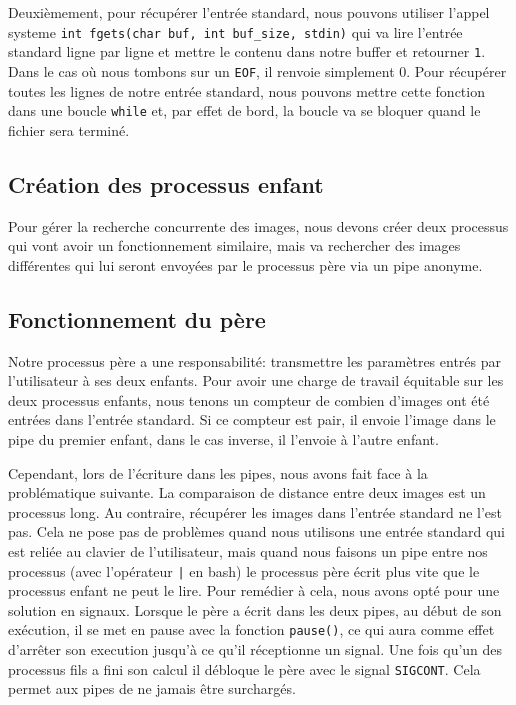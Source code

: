 \documentclass[french]{article}
\begin{document}
Deuxièmement, pour récupérer l'entrée standard, nous pouvons utiliser l'appel systeme \texttt{int fgets(char buf, int buf\_size, stdin)} qui va lire
l'entrée standard ligne par ligne et mettre le contenu dans notre buffer et retourner \texttt{1}. Dans le cas où nous tombons sur un \texttt{EOF}, il renvoie 
simplement 0. Pour récupérer toutes les lignes de notre entrée standard, nous pouvons mettre cette fonction dans une boucle \texttt{while} et, par effet de bord,
la boucle va se bloquer quand le fichier sera terminé. 

\subsection{Création des processus enfant}
Pour gérer la recherche concurrente des images, nous devons créer deux processus qui vont avoir un fonctionnement similaire, mais va rechercher des images différentes
qui lui seront envoyées par le processus père via un pipe anonyme.

\subsection{Fonctionnement du père}
Notre processus père a une responsabilité: transmettre les paramètres entrés par l'utilisateur à ses deux enfants. Pour avoir une charge de travail équitable sur les 
deux processus enfants, nous tenons un compteur de combien d'images ont été entrées dans l'entrée standard. Si ce compteur est pair, il envoie l'image dans le pipe 
du premier enfant, dans le cas inverse, il l'envoie à l'autre enfant. 

Cependant, lors de l'écriture dans les pipes, nous avons fait face à la problématique suivante. La comparaison de distance entre deux images est un processus long. Au 
contraire, récupérer les images dans l'entrée standard ne l'est pas. Cela ne pose pas de problèmes quand nous utilisons une entrée standard qui est reliée au clavier 
de l'utilisateur, mais quand nous faisons un pipe entre nos processus (avec l'opérateur \texttt{|} en bash) le processus père écrit plus vite 
que le processus enfant ne peut le lire. Pour remédier à cela, nous avons opté pour une solution en signaux. Lorsque le père a écrit dans les deux pipes, au début 
de son exécution, il se met en pause avec la fonction \texttt{pause()}, ce qui aura comme effet d'arrêter son execution jusqu'à ce qu'il réceptionne un signal. 
Une fois qu'un des processus fils a fini son calcul il débloque le père avec le signal \texttt{SIGCONT}. Cela permet aux pipes de ne jamais être surchargés. 
\end{document}
